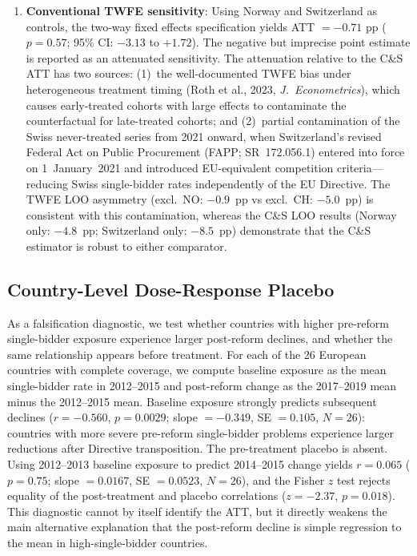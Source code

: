 \documentclass[11pt]{article}
\begin{document}
\begin{enumerate}
\item \textbf{Conventional TWFE sensitivity}: Using Norway and Switzerland as controls, the two-way fixed effects specification yields ATT $= -0.71$ pp ($p = 0.57$; 95\% CI: $-3.13$ to $+1.72$). The negative but imprecise point estimate is reported as an attenuated sensitivity. The attenuation relative to the C\&S ATT has two sources: (1)~the well-documented TWFE bias under heterogeneous treatment timing (Roth et al., 2023, \textit{J.\ Econometrics}), which causes early-treated cohorts with large effects to contaminate the counterfactual for late-treated cohorts; and (2)~partial contamination of the Swiss never-treated series from 2021 onward, when Switzerland's revised Federal Act on Public Procurement (FAPP; SR~172.056.1) entered into force on 1~January~2021 and introduced EU-equivalent competition criteria---reducing Swiss single-bidder rates independently of the EU Directive. The TWFE LOO asymmetry (excl.\ NO: $-0.9$~pp vs excl.\ CH: $-5.0$~pp) is consistent with this contamination, whereas the C\&S LOO results (Norway only: $-4.8$~pp; Switzerland only: $-8.5$~pp) demonstrate that the C\&S estimator is robust to either comparator.
\end{enumerate}

\subsection{Country-Level Dose-Response Placebo}

As a falsification diagnostic, we test whether countries with higher pre-reform single-bidder exposure experience larger post-reform declines, and whether the same relationship appears before treatment. For each of the 26 European countries with complete coverage, we compute baseline exposure as the mean single-bidder rate in 2012--2015 and post-reform change as the 2017--2019 mean minus the 2012--2015 mean. Baseline exposure strongly predicts subsequent declines ($r = -0.560$, $p = 0.0029$; slope $= -0.349$, SE $= 0.105$, $N = 26$): countries with more severe pre-reform single-bidder problems experience larger reductions after Directive transposition. The pre-treatment placebo is absent. Using 2012--2013 baseline exposure to predict 2014--2015 change yields $r = 0.065$ ($p = 0.75$; slope $= 0.0167$, SE $= 0.0523$, $N = 26$), and the Fisher $z$ test rejects equality of the post-treatment and placebo correlations ($z = -2.37$, $p = 0.018$). This diagnostic cannot by itself identify the ATT, but it directly weakens the main alternative explanation that the post-reform decline is simple regression to the mean in high-single-bidder countries.
\end{document}

